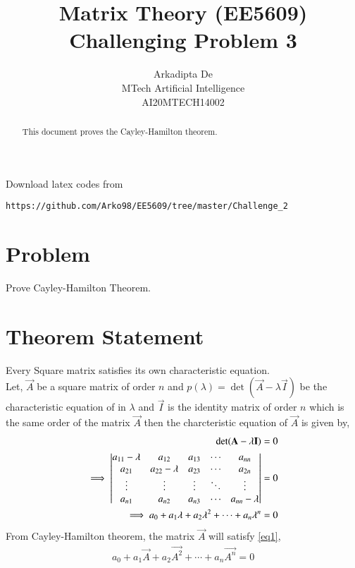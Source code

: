 \documentclass[journal,12pt,twocolumn]{IEEEtran}
\begin{document}
     \def\rightbox#1{\makebox[0in][r]{#1}}
     \def\centbox#1{\makebox[0in]{#1}}
     \def\topbox#1{\raisebox{-\baselineskip}[0in][0in]{#1}}
     \def\midbox#1{\raisebox{-0.5\baselineskip}[0in][0in]{#1}}
\vspace{3cm}
\title{Matrix Theory (EE5609) Challenging Problem 3}
\author{Arkadipta De\\MTech Artificial Intelligence\\AI20MTECH14002}
\maketitle
\newpage
\bigskip
\renewcommand{\thefigure}{\theenumi}
\renewcommand{\thetable}{\theenumi}
\begin{abstract}
This document proves the Cayley-Hamilton theorem.
\end{abstract}
Download latex codes from 
%
\begin{lstlisting}
https://github.com/Arko98/EE5609/tree/master/Challenge_2
\end{lstlisting}
%
\section{Problem}
Prove Cayley-Hamilton Theorem.
\section{Theorem Statement}
Every Square matrix satisfies its own characteristic equation.\\
Let, $\vec{A}$ be a square matrix of order $n$ and $p(\lambda) = \det({\vec{A}-\lambda \vec{I}})$ be the characteristic equation of  in $\lambda$ and $\vec{I}$ is the identity matrix of order $n$ which is the same order of the matrix $\vec{A}$ then the charcteristic equation of $\vec{A}$ is given by,
\begin{align}  
\det({\mathbf{A}-\lambda \mathbf{I}}) &= 0\\
\implies\begin{vmatrix}a_{11}-\lambda & a_{12} & a_{13} & \cdots & a_{nn}\\ 
a_{21} & a_{22}-\lambda & a_{23}& \cdots & a_{2n} \\
\vdots & \vdots & \vdots & \ddots &\vdots \\
a_{n1} & a_{n2} & a_{n3} & \cdots & a_{nn}-\lambda \\ \end{vmatrix} &= 0\\
\implies a_0 + a_1\lambda + a_2\lambda^{2} +  \cdots+a_n\lambda^{n} &= 0\label{eq1}
\end{align}
From Cayley-Hamilton theorem, the matrix $\vec{A}$ will satisfy \eqref{eq1},
\begin{align} 
a_0 + a_1\vec{A} + a_2\vec{A^{2}} + \cdots+a_n\vec{A^{n}} = 0 \label{eq2}
\end{align}
\end{document}

